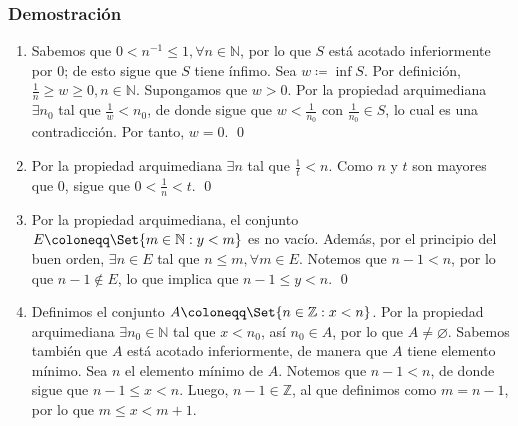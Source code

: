 \documentclass[11pt]{article}
\newcommand{\N}{\mathbb{N}}
\newcommand{\Z}{\mathbb{Z}}
\let\emptyset\varnothing
\let\set\Set
\begin{document}
\subsubsection*{Demostración}

\begin{enumerate}[label=\alph*)]
    \item Sabemos que $0<n^{-1}\leq 1, \forall n\in \N$, por lo que $S$ está acotado inferiormente por $0$; de esto sigue que $S$ tiene ínfimo. Sea $w\coloneqq \inf{S}$. Por definición, $\frac{1}{n}\geq w\geq 0, n\in \N$. Supongamos que $w>0$. Por la propiedad arquimediana $\exists n_0$ tal que $\frac{1}{w} < n_0$, de donde sigue que $w<\frac{1}{n_0}$ con $\frac{1}{n_0} \in S$, lo cual es una contradicción. Por tanto, $w=0$. \qed
    
    \item Por la propiedad arquimediana $\exists n$ tal que $\frac{1}{t}<n$. Como $n$ y $t$ son mayores que $0$, sigue que $0<\frac{1}{n}<t$. \qed
    
    \item Por la propiedad arquimediana, el conjunto $E\coloneqq \set{m\in \N: y<m}$ es no vacío. Además, por el principio del buen orden, $\exists n\in E$ tal que $n\leq m, \forall m\in E$. Notemos que $n-1<n$, por lo que $n-1\notin E$, lo que implica que $n-1\leq y<n$. \qed
    
    \item Definimos el conjunto $A\coloneqq \set{n\in \Z: x<n}$. Por la propiedad arquimediana $\exists n_0 \in \N$ tal que $x<n_0$, así $n_0\in A$, por lo que $A\neq \emptyset$. Sabemos también que $A$ está acotado inferiormente, de manera que $A$ tiene elemento mínimo. Sea $n$ el elemento mínimo de $A$. Notemos que $n-1<n$, de donde sigue que $n-1\leq x<n$. Luego, $n-1\in \Z$, al que definimos como $m=n-1$, por lo que $m\leq x<m+1$.
    

\end{enumerate}
\end{document}
